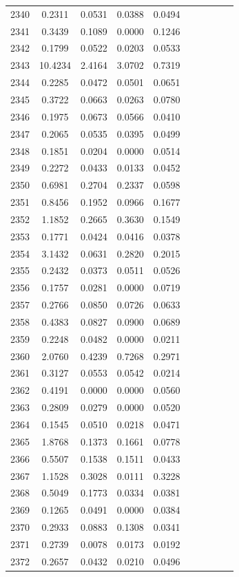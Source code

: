 \begin{table}
\begin{tabular}{cccccccccc}
2340& 0.2311& 0.0531& 0.0388& 0.0494\\ 
2341& 0.3439& 0.1089& 0.0000& 0.1246\\ 
2342& 0.1799& 0.0522& 0.0203& 0.0533\\ 
2343& 10.4234& 2.4164& 3.0702& 0.7319\\ 
2344& 0.2285& 0.0472& 0.0501& 0.0651\\ 
2345& 0.3722& 0.0663& 0.0263& 0.0780\\ 
2346& 0.1975& 0.0673& 0.0566& 0.0410\\ 
2347& 0.2065& 0.0535& 0.0395& 0.0499\\ 
2348& 0.1851& 0.0204& 0.0000& 0.0514\\ 
2349& 0.2272& 0.0433& 0.0133& 0.0452\\ 
2350& 0.6981& 0.2704& 0.2337& 0.0598\\ 
2351& 0.8456& 0.1952& 0.0966& 0.1677\\ 
2352& 1.1852& 0.2665& 0.3630& 0.1549\\ 
2353& 0.1771& 0.0424& 0.0416& 0.0378\\ 
2354& 3.1432& 0.0631& 0.2820& 0.2015\\ 
2355& 0.2432& 0.0373& 0.0511& 0.0526\\ 
2356& 0.1757& 0.0281& 0.0000& 0.0719\\ 
2357& 0.2766& 0.0850& 0.0726& 0.0633\\ 
2358& 0.4383& 0.0827& 0.0900& 0.0689\\ 
2359& 0.2248& 0.0482& 0.0000& 0.0211\\ 
2360& 2.0760& 0.4239& 0.7268& 0.2971\\ 
2361& 0.3127& 0.0553& 0.0542& 0.0214\\ 
2362& 0.4191& 0.0000& 0.0000& 0.0560\\ 
2363& 0.2809& 0.0279& 0.0000& 0.0520\\ 
2364& 0.1545& 0.0510& 0.0218& 0.0471\\ 
2365& 1.8768& 0.1373& 0.1661& 0.0778\\ 
2366& 0.5507& 0.1538& 0.1511& 0.0433\\ 
2367& 1.1528& 0.3028& 0.0111& 0.3228\\ 
2368& 0.5049& 0.1773& 0.0334& 0.0381\\ 
2369& 0.1265& 0.0491& 0.0000& 0.0384\\ 
2370& 0.2933& 0.0883& 0.1308& 0.0341\\ 
2371& 0.2739& 0.0078& 0.0173& 0.0192\\ 
2372& 0.2657& 0.0432& 0.0210& 0.0496\\ 

\end{tabular}
\end{table}
